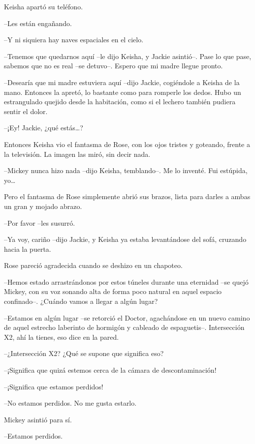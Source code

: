 {Keisha apartó su teléfono.}

{--Les están engañando.}

{--Y ni siquiera hay naves espaciales en el cielo.}

{--Tenemos que quedarnos aquí --le dijo Keisha, y Jackie asintió--. Pase
 lo que pase, sabemos que no es real --se detuvo--. Espero que mi madre
llegue pronto.}

{--Desearía que mi madre estuviera aquí --dijo Jackie, cogiéndole a
 Keisha de la mano. Entonces la apretó, lo bastante como para romperle
 los dedos. Hubo un estrangulado quejido desde la habitación, como si el
lechero también pudiera sentir el dolor.}

{--¡Ey! Jackie, ¿qué estás\ldots{}?}

{Entonces Keisha vio el fantasma de Rose, con los ojos tristes y
goteando, frente a la televisión. La imagen las miró, sin decir nada.}

{--Mickey nunca hizo nada --dijo Keisha, temblando--. Me lo inventé. Fui
 estúpida, yo\ldots{}}

{Pero el fantasma de Rose simplemente abrió sus brazos, lista para
darles a ambas un gran y mojado abrazo.}

{--Por favor --les susurró.}

{--Ya voy, cariño --dijo Jackie, y Keisha ya estaba levantándose del
sofá, cruzando hacia la puerta.}

{Rose pareció agradecida cuando se deshizo en un chapoteo.}

\mbox{}

{--Hemos estado arrastrándonos por estos túneles durante una eternidad
 --se quejó Mickey, con su voz sonando alta de forma poco natural en
aquel espacio confinado--. ¿Cuándo vamos a llegar a algún lugar?}

{--Estamos en algún lugar --se retorció el Doctor, agachándose en un
 nuevo camino de aquel estrecho laberinto de hormigón y cableado de
espaguetis--. Intersección X2, ahí la tienes, eso dice en la pared.}

{--¿Intersección X2? ¿Qué se supone que significa eso?}

{--¡Significa que quizá estemos cerca de la cámara de descontaminación!}

{--¡Significa que estamos perdidos!}

{--No estamos perdidos. No me gusta estarlo.}

{Mickey asintió para sí.}

{--Estamos perdidos.}

